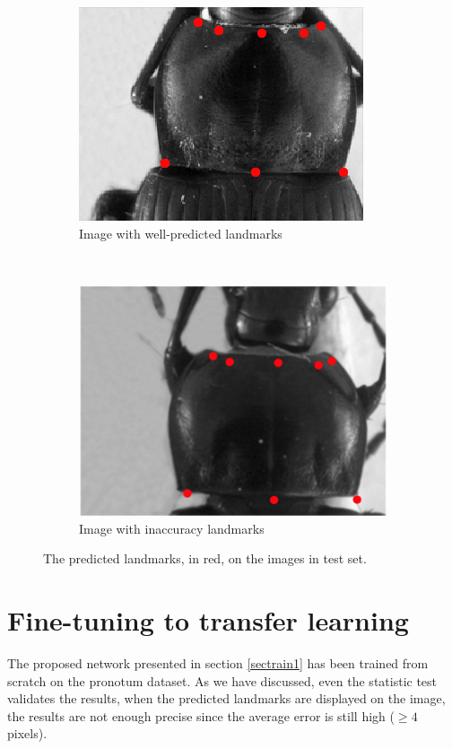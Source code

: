 \documentclass[10pt]{article}
\begin{document}
\begin{figure}[htbp]
    \centering
    \begin{subfigure}[t]{0.25\textwidth}
        \centering
        \includegraphics[scale=1.3]{images/fn_accuracy}
        \caption{\small{Image with well-predicted landmarks}}
        \label{figsub1}
    \end{subfigure}%
    ~ 
    \begin{subfigure}[t]{0.25\textwidth}
        \centering
        \includegraphics[scale=.63]{images/plandmark2}
        \caption{\small{Image with inaccuracy landmarks}}
        \label{figsub2}
    \end{subfigure}
    \caption{\small{The predicted landmarks, in red,  on the images in test set.}}
    \label{figrsexample}
\end{figure}

\section{Fine-tuning to transfer learning}
\label{secimproving}
The proposed network presented in section \ref{sectrain1} has been trained from scratch on the pronotum dataset. As we have discussed, even the statistic test validates the results, when the predicted landmarks are displayed on the image, the results are not enough precise since the average error is still high ($\geq 4$ pixels).
\end{document}

